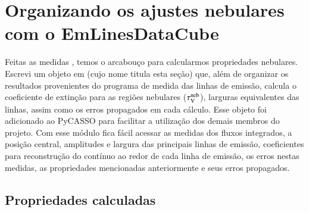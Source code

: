 

\chapter{Organizando os ajustes nebulares com o EmLinesDataCube}
\label{apendice:EmLinesDataCube}

Feitas as medidas , temos o arcabouço para calcularmos propriedades nebulares. Escrevi um objeto em \pyt (cujo nome titula esta seção) que, além de organizar os resultados provenientes do programa de medida das linhas de emissão, calcula o coeficiente de extinção para as regiões nebulares ($\tau_{\mathrm{V}}^{\mathrm{neb}}$), larguras equivalentes das linhas, assim como os erros propagados em cada cálculo. Esse objeto foi adicionado ao PyCASSO para facilitar a utilização dos demais membros do projeto. Com esse módulo fica fácil acessar as medidas dos fluxos integrados, a posição central, amplitudes e largura das principais linhas de emissão, coeficientes para reconstrução do contínuo ao redor de cada linha de emissão, os erros nestas medidas, as propriedades mencionadas anteriormente e seus erros propagados.


\section{Propriedades calculadas}
\label{apendice:EmLinesDataCube:props}

